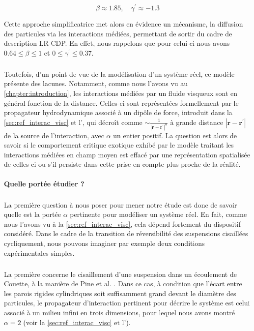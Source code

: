 \begin{equation}
	\beta \approx 1.85, \quad \gamma^\prime \approx -1.3 
\end{equation}

\noindent Cette approche simplificatrice met alors en évidence un mécanisme, la diffusion des particules via les interactions médiées, permettant de sortir du cadre de description LR-CDP. En effet, nous rappelons que pour celui-ci nous avons $0.64 \leq \beta \leq 1$ et $0 \leq\gamma^\prime \leq 0.37$. 

\subparagraph{}Toutefois, d'un point de vue de la modélisation d'un système réel, ce modèle présente des lacunes. Notamment, comme nous l'avons vu au \autoref{chapter:introduction}, les interactions médiées par un fluide visqueux sont en général fonction de la distance. Celles-ci sont représentées formellement par le propagateur hydrodynamique associé à un dipôle de force, introduit dans la \autoref{sec:ref_interac_visc} et l', qui décroît comme $\sim \frac{1}{|\mathbf{r} - \mathbf{r}^\prime|^\alpha}$ à grande distance $|\mathbf{r} - \mathbf{r}^\prime|$ de la source de l'interaction, avec $\alpha$ un entier positif. La question est alors de savoir si le comportement critique exotique exhibé par le modèle traitant les interactions médiées en champ moyen est effacé par une représentation spatialisée de celles-ci ou s'il persiste dans cette prise en compte plus proche de la réalité.

\paragraph{Quelle portée étudier ?}

\subparagraph{}La première question à nous poser pour mener notre étude est donc de savoir quelle est la portée $\alpha$ pertinente pour modéliser un système réel. En fait, comme nous l'avons vu à la \autoref{sec:ref_interac_visc}, cela dépend fortement du dispositif considéré. Dans le cadre de la transition de réversibilité des suspensions cisaillées cycliquement, nous pouvons imaginer par exemple deux conditions expérimentales simples.

\subparagraph{}La première concerne le cisaillement d'une suspension dans un écoulement de Couette, à la manière de Pine et al. \cite{pine_chaos_2005}. Dans ce cas, à condition que l'écart entre les parois rigides cylindriques soit suffisamment grand devant le diamètre des particules, le propagateur d'interaction pertinent pour décrire le système est celui associé à un milieu infini en trois dimensions, pour lequel nous avons montré $\alpha = 2$ (voir la \autoref{sec:ref_interac_visc} et l').

